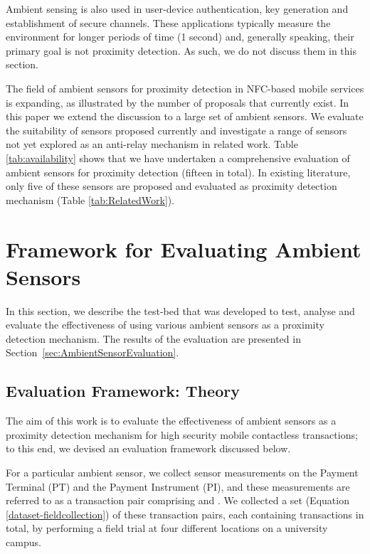 \documentclass{article}
\begin{document}
Ambient sensing is also used in user-device authentication, key generation and establishment of secure channels.  These applications typically measure the environment for longer periods of time (1 second) and, generally speaking, their primary goal is not proximity detection.  As such, we do not discuss them in this section.  

The field of ambient sensors for proximity detection in NFC-based mobile services is expanding, as illustrated by the number of proposals that currently exist.  In this paper we extend the discussion to a large set of ambient sensors.  We evaluate the suitability of sensors proposed currently and investigate a range of sensors not yet explored as an anti-relay mechanism in related work.  Table \ref{tab:availability} shows that we have undertaken a comprehensive evaluation of ambient sensors for proximity detection (fifteen in total).  In existing literature, only five of these sensors are proposed and evaluated as proximity detection mechanism (Table \ref{tab:RelatedWork}).  

\section{Framework for Evaluating Ambient Sensors}
\label{sec:FrameworkforEvaluationofAmbientSensorsEffectiveness}

In this section, we describe the test-bed that was developed to test, analyse and evaluate the effectiveness of using various ambient sensors as a proximity detection mechanism.  The results of the evaluation are presented in Section~\ref{sec:AmbientSensorEvaluation}.

\subsection{Evaluation Framework: Theory}
\label{sec:EvaluationFrameworkinTheory}
The aim of this work is to evaluate the effectiveness of ambient sensors as a proximity detection mechanism for high security mobile contactless transactions; to this end, we devised an evaluation framework discussed below.



For a particular ambient sensor, we collect sensor measurements on the Payment Terminal (PT) and the Payment Instrument (PI), and these measurements are referred to as a transaction pair comprising  and .  We collected a set (Equation \ref{dataset-fieldcollection}) of these transaction pairs, each containing  transactions in total, by performing a field trial at four different locations on a university campus.
\end{document}
